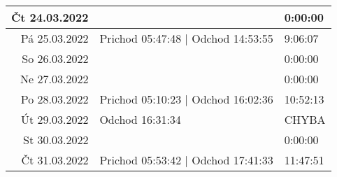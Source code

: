 \documentclass[10pt, a4paper]{article}%
\begin{document}
\begin{table}[ht!]
\begin{tabularx}{\textwidth}{|d|X|h}
Čt 24.03.2022 &  & 0:00:00  \\ \hline
Pá 25.03.2022 &  Prichod 05:47:48 | Odchod 14:53:55  & 9:06:07  \\ \hline
So 26.03.2022 &  & 0:00:00  \\ \hline
Ne 27.03.2022 &  & 0:00:00  \\ \hline
Po 28.03.2022 &  Prichod 05:10:23 | Odchod 16:02:36  & 10:52:13  \\ \hline
Út 29.03.2022 &  Odchod 16:31:34  & CHYBA  \\ \hline
St 30.03.2022 &  & 0:00:00  \\ \hline
Čt 31.03.2022 &  Prichod 05:53:42 | Odchod 17:41:33  & 11:47:51  \\ \hline

\end{tabularx}
\end{table}
\end{document}

